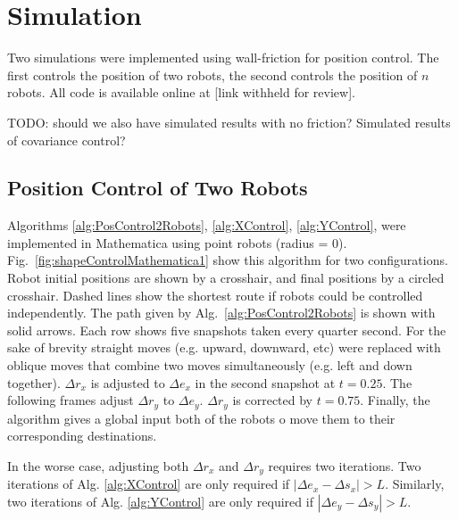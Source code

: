 
\section{Simulation}\label{sec:simulation}

Two simulations were implemented using wall-friction for position control.  The first controls the position of two robots, the second controls the position of $n$ robots.  All code is available online at [link withheld for review].

TODO: should we also have simulated results with no friction?  Simulated results of covariance control?


\subsection{Position Control of Two Robots}

Algorithms \ref{alg:PosControl2Robots}, \ref{alg:XControl}, \ref{alg:YControl}, were implemented in Mathematica using point robots (radius = $0$).  Fig.~\ref{fig:shapeControlMathematica1}  show  this algorithm for two configurations. 
Robot initial positions are shown by a crosshair, and final positions by a circled crosshair.  Dashed lines show the shortest route if robots could be controlled independently.  The path given by  Alg.\ \ref{alg:PosControl2Robots} is shown with solid arrows.
Each row shows five snapshots taken every quarter second. For the sake of brevity straight moves (e.g. upward, downward, etc) were replaced with oblique moves that combine two moves simultaneously (e.g. left and down together). 
 $\Delta r_x$ is adjusted to $\Delta e_x$ in the second snapshot at $t = 0.25$. 
 The following frames  adjust $\Delta r_y$ to $\Delta e_y$. 
 $\Delta r_y$ is corrected by $t = 0.75$. 
 Finally, the algorithm gives a global input both of the robots o move them to their corresponding destinations.

In the worse case, adjusting both $\Delta r_x$ and $\Delta r_y$ requires two iterations.   Two iterations of Alg. \ref{alg:XControl} are only required if $|\Delta e_x - \Delta s_x|>L$. 
Similarly,  two iterations of Alg. \ref{alg:YControl} are only required if $|\Delta e_y - \Delta s_y|>L$.









